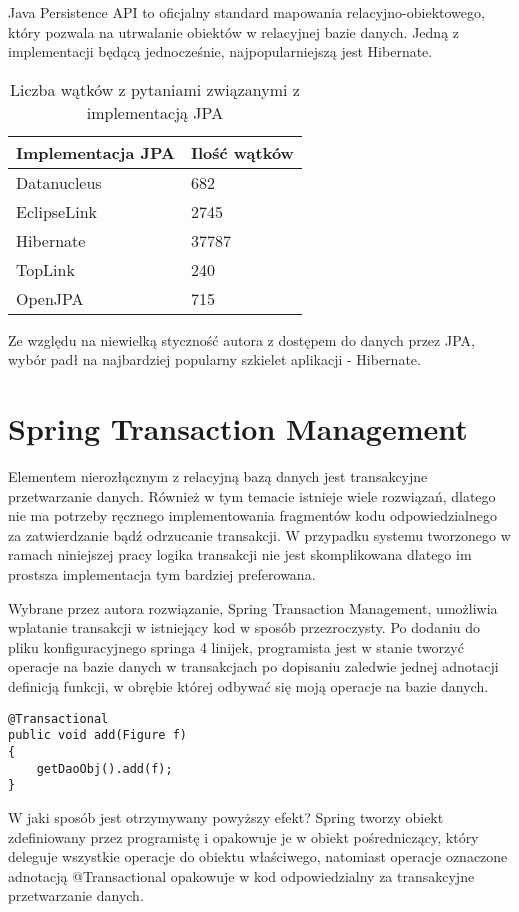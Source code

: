Java Persistence API to oficjalny standard mapowania relacyjno-obiektowego, który pozwala na utrwalanie obiektów w relacyjnej bazie danych. Jedną z implementacji będącą jednocześnie, najpopularniejszą jest Hibernate.

\begin{table}[H]
\caption{Liczba wątków z pytaniami związanymi z implementacją JPA}
\label{jpaImplementations}
\begin{center}
\begin{tabular}{|l|l|}
\multicolumn{1}{c}{Implementacja JPA} & \multicolumn{1}{c}{Ilość wątków} \\ \hline
Datanucleus & 682 \\ \hline
EclipseLink & 2745 \\ \hline
Hibernate & 37787 \\ \hline
TopLink & 240 \\ \hline
OpenJPA & 715 \\ \hline
\end{tabular} 
\end{center}
\end{table} 

Ze względu na niewielką styczność autora z dostępem do danych przez JPA, wybór padł na najbardziej popularny szkielet aplikacji - Hibernate.

\section{Spring Transaction Management}
Elementem nierozłącznym z relacyjną bazą danych jest transakcyjne przetwarzanie danych. Również w tym temacie istnieje wiele rozwiązań, dlatego nie ma potrzeby ręcznego implementowania fragmentów kodu odpowiedzialnego za zatwierdzanie bądź odrzucanie transakcji. W przypadku systemu tworzonego w ramach niniejszej pracy logika transakcji nie jest skomplikowana dlatego im prostsza implementacja tym bardziej preferowana.

Wybrane przez autora rozwiązanie, Spring Transaction Management, umożliwia wplatanie transakcji w istniejący kod w sposób przezroczysty. Po dodaniu do pliku konfiguracyjnego springa 4 linijek, programista jest w stanie tworzyć operacje na bazie danych w transakcjach po dopisaniu zaledwie jednej adnotacji definicją funkcji, w obrębie której odbywać się moją operacje na bazie danych.

\begin{lstlisting}
@Transactional
public void add(Figure f)
{
	getDaoObj().add(f);
}
\end{lstlisting}
\newpage
W jaki sposób jest otrzymywany powyższy efekt? Spring tworzy obiekt zdefiniowany przez programistę i opakowuje je w obiekt pośredniczący, który deleguje wszystkie operacje do obiektu właściwego, natomiast operacje oznaczone adnotacją @Transactional opakowuje w kod odpowiedzialny za transakcyjne przetwarzanie danych.

